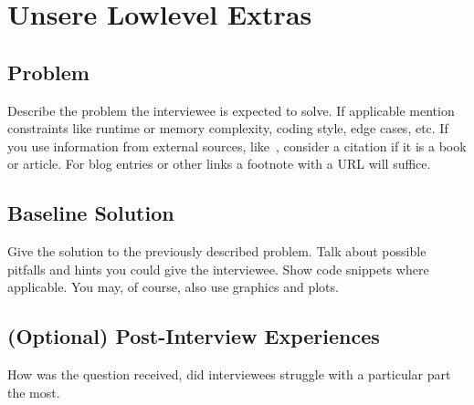 \section{Unsere Lowlevel Extras}

\subsection{Problem}

Describe the problem the interviewee is expected to solve. If applicable
mention constraints like runtime or memory complexity, coding style, edge
cases, etc. If you use information from external sources,
like~\cite{McDowell_Cracking_2015}, consider a citation if it is a book or
article. For blog entries or other links a footnote with a URL will suffice.

\subsection{Baseline Solution}

Give the solution to the previously described problem. Talk about possible
pitfalls and hints you could give the interviewee. Show code snippets where
applicable. You may, of course, also use graphics and plots.

\subsection{(Optional) Post-Interview Experiences}

How was the question received, did interviewees struggle with a particular part
the most.
